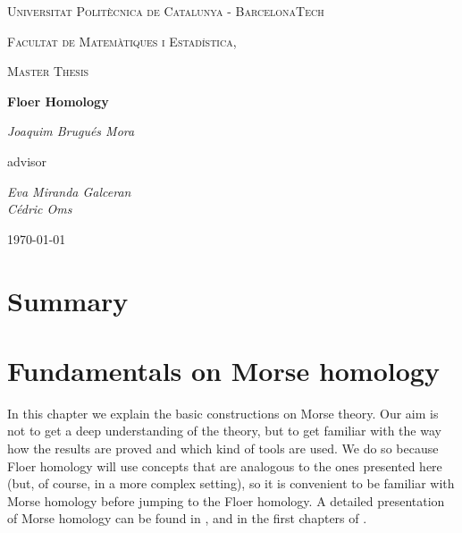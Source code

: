 \documentclass[a4paper,11pt]{book}
\theoremstyle{indented}
\begin{document}
\begin{titlepage}
	\centering
	{\scshape\LARGE Universitat Politècnica de Catalunya - BarcelonaTech\par}
	{\scshape\LARGE Facultat de Matemàtiques i Estadística, \par}
	\vspace{1cm}
	{\scshape\Large Master Thesis\par}
	\vspace{1.5cm}
	{\huge\bfseries Floer Homology\par}
	\vspace{2cm}
	{\Large\itshape Joaquim Brugués Mora\par}
	\vfill
	advisor\par
	{\Large\itshape Eva Miranda Galceran \\ Cédric Oms \par}

	\vfill

	{\large \today\par}
\end{titlepage}


\chapter*{Summary}


\tableofcontents

\mainmatter

\chapter{Fundamentals on Morse homology}
In this chapter we explain the basic constructions on Morse theory. Our aim is not to get a deep understanding of the theory, but to get familiar with the way how the results are proved and which kind of tools are used. We do so because Floer homology will use concepts that are analogous to the ones presented here (but, of course, in a more complex setting), so it is convenient to be familiar with Morse homology before jumping to the Floer homology. A detailed presentation of Morse homology can be found in \cite{milnor1963morse}, and in the first chapters of \cite{audin2014morse}.
\end{document}
